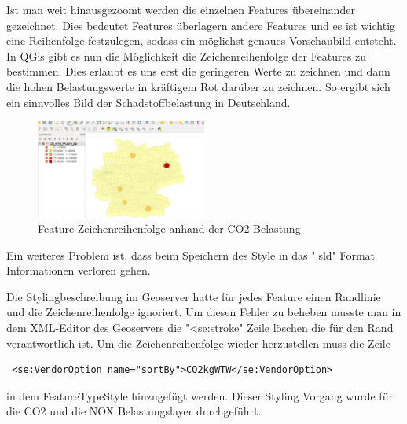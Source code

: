 Ist man weit hinausgezoomt werden die einzelnen Features übereinander gezeichnet. Dies bedeutet Features überlagern andere Features und es ist wichtig eine Reihenfolge festzulegen, sodass ein möglichst genaues Vorschaubild entsteht. In QGis gibt es nun die Möglichkeit die Zeichenreihenfolge der Features zu bestimmen. Dies erlaubt es uns erst die geringeren Werte zu zeichnen und dann die hohen Belastungswerte in kräftigem Rot darüber zu zeichnen. So ergibt sich ein sinnvolles Bild der Schadstoffbelastung in Deutschland.


\begin{figure}
\centering
	\includegraphics[width=0.5\textwidth]{images/zeichenreihenfolge.png}
	\caption{Feature Zeichenreihenfolge anhand der CO2 Belastung}
\end{figure}

Ein weiteres Problem ist, dass beim Speichern des Style in das ".sld" Format Informationen verloren gehen.

Die Stylingbeschreibung im Geoserver hatte für jedes Feature einen Randlinie und die Zeichenreihenfolge ignoriert.
Um diesen Fehler zu beheben musste man in dem XML-Editor des Geoservers die "<se:stroke" Zeile löschen die für den Rand verantwortlich ist.
Um die Zeichenreihenfolge wieder herzustellen muss die Zeile
\begin{lstlisting}
 <se:VendorOption name="sortBy">CO2kgWTW</se:VendorOption>
\end{lstlisting}
in dem FeatureTypeStyle hinzugefügt werden.
Dieser Styling Vorgang wurde für die CO2 und die NOX Belastungslayer durchgeführt.
